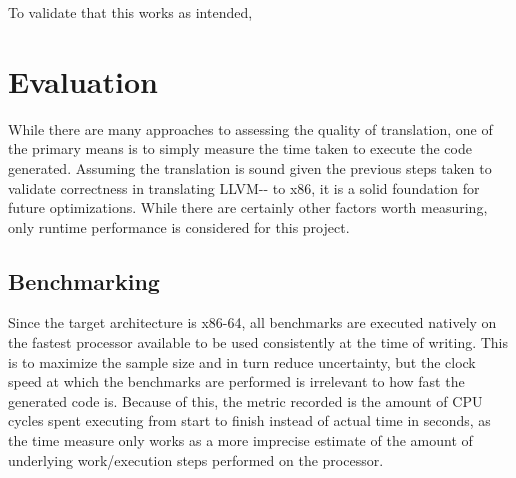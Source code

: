 \documentclass{article}
\begin{document}
To validate that this works as intended, 





\section{Evaluation}

While there are many approaches to assessing the quality of translation, one of the primary means is to simply measure the time taken to execute the code generated. 
Assuming the translation is sound given the previous steps taken to validate correctness in translating LLVM-{}- to x86, it is a solid foundation for future optimizations. While there are certainly other factors worth measuring, only runtime performance is considered for this project. %







\subsection{Benchmarking}


Since the target architecture is x86-64, all benchmarks are executed natively on the fastest processor available to be used consistently at the time of writing. This is to maximize the sample size and in turn reduce uncertainty, but the clock speed at which the benchmarks are performed is irrelevant to how fast the generated code is. Because of this, the metric recorded is the amount of CPU cycles spent executing from start to finish instead of actual time in seconds, as the time measure only works as a more imprecise estimate of the amount of underlying work/execution steps performed on the processor.
\end{document}
